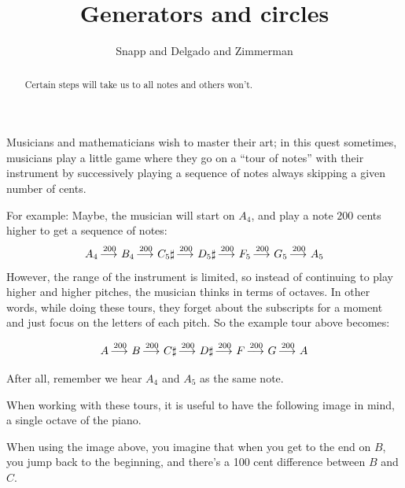 \documentclass[12pt,noauthor,nooutcomes, handout]{ximera}
\author{Snapp and Delgado and Zimmerman}
\title{Generators and circles}
\begin{document}
\begin{abstract}
  Certain steps will take us to all notes and others won't.
\end{abstract}
\maketitle




Musicians and mathematicians wish to master their art; in this quest sometimes, musicians play a little game where they go on a ``tour of notes'' with their instrument by successively playing a sequence of notes always skipping a given number of cents. 

For example: Maybe, the musician will start on $A_4$, and play a note $200$ cents higher to get a sequence of notes:
\[
A_4 \mathop{\longrightarrow\,}\limits^{200} B_4 \mathop{\longrightarrow\,}\limits^{200} C_5\sharp \mathop{\longrightarrow\,}\limits^{200} D_5\sharp \mathop{\longrightarrow\,}\limits^{200} F_5 \mathop{\longrightarrow\,}\limits^{200} G_5 \mathop{\longrightarrow\,}\limits^{200} A_5
\]
However, the range of the instrument is limited, so instead of continuing to play higher and higher pitches, the musician thinks in terms of octaves. In other words, while doing these tours, they forget about the subscripts for a moment and just focus on the letters of each pitch. So the example tour above becomes:

\[
A \mathop{\longrightarrow\,}\limits^{200} B \mathop{\longrightarrow\,}\limits^{200} C\sharp \mathop{\longrightarrow\,}\limits^{200} D\sharp \mathop{\longrightarrow\,}\limits^{200} F \mathop{\longrightarrow\,}\limits^{200} G \mathop{\longrightarrow\,}\limits^{200} A
\]

After all, remember we hear $A_4$ and $A_5$ as the same note.


When working with these tours, it is useful to have the following image in mind, a single octave of the piano.

\ttPianoNoStaff

When using the image above, you imagine that when you get to the end on $B$, you jump back to the beginning, and there's a 100 cent difference between $B$ and $C$.
\end{document}
